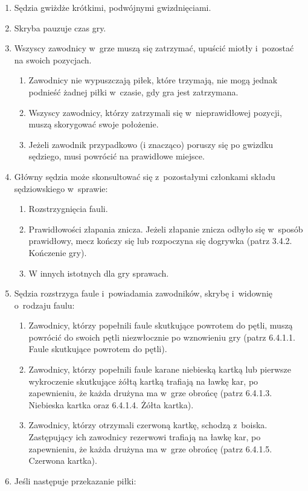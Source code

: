 \documentclass[12pt]{article}
\begin{document}
\begin{enumerate}
	\item
	      Sędzia gwiżdże krótkimi, podwójnymi gwizdnięciami.
	\item
	      Skryba pauzuje czas gry.
	\item
	      Wszyscy zawodnicy w~grze muszą się zatrzymać, upuścić miotły i~pozostać na swoich pozycjach.

	      \begin{enumerate}
		      \item
		            Zawodnicy nie wypuszczają piłek, które trzymają, nie mogą jednak
		            podnieść żadnej piłki w~czasie, gdy gra jest zatrzymana.
		      \item
		            Wszyscy zawodnicy, którzy zatrzymali się w~nieprawidłowej pozycji,
		            muszą skorygować swoje położenie.
		      \item
		            Jeżeli zawodnik przypadkowo (i znacząco) poruszy się po gwizdku
		            sędziego, musi powrócić na prawidłowe miejsce.
	      \end{enumerate}
	\item
	      Główny sędzia może skonsultować się z~pozostałymi członkami składu
	      sędziowskiego w~sprawie:

	      \begin{enumerate}
		      \item
		            Rozstrzygnięcia fauli.
		      \item
		            Prawidłowości złapania znicza. Jeżeli złapanie znicza odbyło się w~sposób prawidłowy, mecz kończy się lub rozpoczyna się dogrywka
		            (patrz 3.4.2. Kończenie gry).
		      \item
		            W innych istotnych dla gry sprawach.
	      \end{enumerate}
	\item
	      Sędzia rozstrzyga faule i~powiadamia zawodników, skrybę i~widownię o~rodzaju faulu:

	      \begin{enumerate}
		      \item
		            Zawodnicy, którzy popełnili faule skutkujące powrotem do pętli,
		            muszą powrócić do swoich pętli niezwłocznie po wznowieniu gry (patrz
		            6.4.1.1. Faule skutkujące powrotem do pętli).
		      \item
		            Zawodnicy, którzy popełnili faule karane niebieską kartką lub
		            pierwsze wykroczenie skutkujące żółtą kartką trafiają na ławkę kar,
		            po zapewnieniu, że każda drużyna ma w~grze obrońcę (patrz 6.4.1.3.
		            Niebieska kartka oraz 6.4.1.4. Żółta kartka).
		      \item
		            Zawodnicy, którzy otrzymali czerwoną kartkę, schodzą z~boiska.
		            Zastępujący ich zawodnicy rezerwowi trafiają na ławkę kar, po
		            zapewnieniu, że każda drużyna ma w~grze obrońcę (patrz 6.4.1.5.
		            Czerwona kartka).
	      \end{enumerate}
	\item
	      Jeśli następuje przekazanie piłki:


\end{enumerate}
\end{document}
